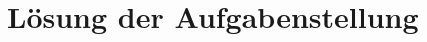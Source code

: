 \chapter{L\"osung der Aufgabenstellung}

\section{}



\subsection{}

%

\section{}

\subsection{}


